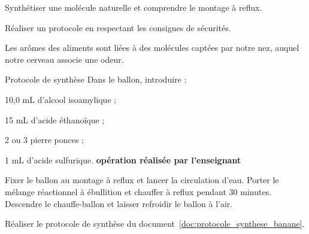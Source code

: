 \sndEnTeteSix

\vspace*{-38pt}

\begin{objectifs}
  \item Synthétiser une molécule naturelle et comprendre le montage à reflux.
  \item Réaliser un protocole en respectant les consignes de sécurités.
\end{objectifs}

\begin{contexte}
  Les arômes des aliments sont liées à des molécules captées par notre nez, auquel notre cerveau associe une odeur.
  
\end{contexte}


\begin{doc}{Protocole de synthèse}
  \label{doc:protocole_synthese_banane}
  Dans le ballon, introduire :
  \begin{listePoints}
    \item 10,0 mL d'alcool isoamylique ;
    \item 15 mL d'acide éthanoïque ;
    \item 2 ou 3 pierre ponces ;
    \item 1 mL d'acide sulfurique. \attention \textbf{opération réalisée par l'enseignant} \attention
  \end{listePoints}
  
  Fixer le ballon au montage à reflux et lancer la circulation d'eau.
  Porter le mélange réactionnel à ébullition et chauffer à reflux pendant 30 minutes.
  Descendre le chauffe-ballon et laisser refroidir le ballon à l'air.
\end{doc}

\mesure Réaliser le protocole de synthèse du document~\ref{doc:protocole_synthese_banane}.


